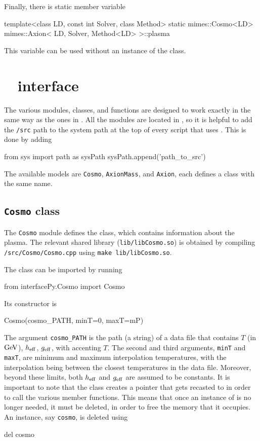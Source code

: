 \documentclass[11pt,a4paper]{article}
\begin{document}
Finally, there is static  member variable
%
\begin{cpp}
	template<class LD, const int Solver, class Method>
	static mimes::Cosmo<LD> mimes::Axion< LD, Solver, Method<LD> >::plasma
\end{cpp}
%
This variable can be used without an instance of the  class.

\section{\mimes~  \PY interface}\label{app:modules}
\setcounter{equation}{0}

The various \PY modules, classes, and functions are designed to work exactly in the same way as the ones in \CPP. All the modules are located in , so it is helpful to add the {\tt \mimes/src} path to the system path at the top of every script that uses \mimes. This is done by adding
%
\begin{py}
	from sys import path as sysPath
	sysPath.append('path_to_src')
\end{py}

The available models are {\tt Cosmo}, {\tt AxionMass}, and {\tt Axion}, each defines a class with the same name.

\subsection{{\tt Cosmo} class}
%
The {\tt Cosmo} module defines the  class, which contains information about the plasma. The relevant shared library ({\tt lib/libCosmo.so}) is obtained by compiling {\tt \mimes/src/Cosmo/Cosmo.cpp} using {\tt make lib/libCosmo.so}.
%

The class can be imported by running 
%
\begin{py}
	from interfacePy.Cosmo import Cosmo
\end{py}
%
Its constructor is
%
\begin{py}
	Cosmo(cosmo_PATH, minT=0, maxT=mP)
\end{py}
%
The argument {\tt cosmo\_PATH} is the path (a string) of a data file that contains $T$ (in ${\rm GeV}$), $h_{\rm eff}{}$, $g_{\rm eff}{}$, with accenting $T$. The second and third arguments, {\tt minT} and {\tt maxT}, are minimum and maximum interpolation temperatures, with the interpolation being between the closest temperatures in the data file. Moreover, beyond these limits, both $h_{\rm eff}{}$ and $g_{\rm eff}{}$ are assumed to be constants. It is important to note that the class creates a  pointer that gets recasted to  in order to call the various member functions. This means that once an instance of  is no longer needed, it must be deleted, in order to free the memory that it occupies. An instance, say {\tt cosmo}, is deleted using
%
\begin{py}
	del cosmo
\end{py}
\end{document}
